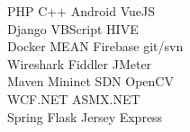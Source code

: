 \documentclass[]{deedy-resume-openfont}
\begin{document}
\begin{minipage}[t]{0.33\textwidth}
PHP \textbullet{} C++ \textbullet{} Android \textbullet{} VueJS \\
Django \textbullet{} VBScript \textbullet{} HIVE \\
Docker \textbullet{} MEAN \textbullet{} Firebase \textbullet{} git/svn \\
Wireshark \textbullet{} Fiddler \textbullet{} JMeter \\
Maven \textbullet{} Mininet SDN \textbullet{} OpenCV \\
WCF.NET \textbullet{} ASMX.NET \\
Spring \textbullet{} Flask \textbullet{} Jersey \textbullet{} Express

\sectionsep

%
%

\end{minipage} 
\hfill
\end{document}
